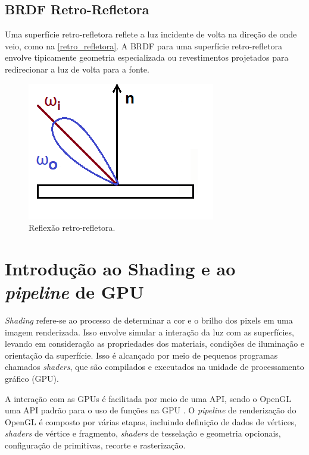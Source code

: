 \documentclass[english,
               brazil,
               bsc] %
               {dcomp-abntex2}
\begin{document}
\subsection{BRDF Retro-Refletora}
Uma superfície retro-refletora reflete a luz incidente de volta na direção de onde veio, como na \autoref{retro_refletora}. A BRDF para uma superfície retro-refletora envolve tipicamente geometria especializada ou revestimentos projetados para redirecionar a luz de volta para a fonte.


\begin{figure}[H]
  \caption{\label{retro_refletora} \small Reflexão retro-refletora.}
        \begin{center}
            \includegraphics[scale=0.5]{./Imagens/retro-reflection-2d.png}
        \end{center}
\end{figure}




\section{Introdução ao Shading e ao \textit{pipeline} de GPU} \label{shading}


\textit{Shading} refere-se ao processo de determinar a cor e o brilho dos pixels em uma imagem renderizada. Isso envolve simular a interação da luz com as superfícies, levando em consideração as propriedades dos materiais, condições de iluminação e orientação da superfície. Isso é alcançado por meio de pequenos programas chamados \textit{shaders}, que são compilados e executados na unidade de processamento gráfico (GPU).




A interação com as GPUs é facilitada por meio de uma 
API, sendo o OpenGL uma API padrão para o uso de funções na GPU \cite{opengl_spec}. O \textit{pipeline} de renderização do OpenGL é composto por várias etapas, incluindo definição de dados de vértices, \textit{shaders} de vértice e fragmento, \textit{shaders} de tesselação e geometria opcionais, configuração de primitivas, recorte e rasterização.
\end{document}
